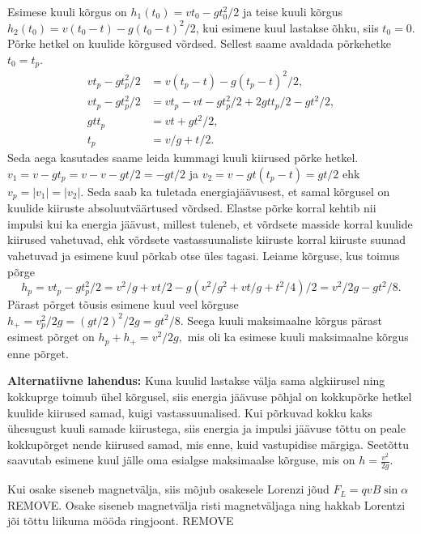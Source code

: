 \documentclass[10pt]{article}
\newcommand{\pp}[1]{REMOVE}
\begin{document}

\solu
Esimese kuuli kõrgus on \(h_1(t_0) = vt_0 - gt_0^2/2\) ja teise kuuli kõrgus \(h_2(t_0) = v(t_0-t) - g(t_0 - t)^2/2\), kui esimene kuul lastakse õhku, siis \(t_0 = 0\). Põrke hetkel on kuulide kõrgused võrdsed. Sellest saame avaldada põrkehetke \(t_0 = t_p\).
\begin{align*}
    vt_p - gt_p^2/2 &= v(t_p-t) - g(t_p -t)^2/2, \\
    vt_p - gt_p^2/2 &= vt_p - vt - gt_p^2/2 + 2gtt_p/2 - gt^2/2,\\
    gtt_p &= vt + gt^2/2, \\
    t_p &= v/g + t/2.
\end{align*}
Seda aega kasutades saame leida kummagi kuuli kiirused põrke hetkel. \(v_1 = v - gt_p = v - v - gt/2 = -gt/2\) ja \(v_2 = v -gt(t_p-t) = gt/2\) ehk \(v_p = |v_1| = |v_2|\). Seda saab ka tuletada energiajäävusest, et samal kõrgusel on kuulide kiiruste absoluutväärtused võrdsed. Elastse põrke korral kehtib nii impulsi kui ka energia jäävust, millest tuleneb, et võrdsete masside korral kuulide kiirused vahetuvad, ehk võrdsete vastassuunaliste kiiruste korral kiiruste suunad vahetuvad ja esimene kuul põrkab otse üles tagasi. Leiame kõrguse, kus toimus põrge
\[h_p = vt_p - gt_p^2/2 = v^2/g + vt/2 - g(v^2/g^2 + vt/g + t^2/4)/2 = v^2/2g - gt^2/8.\]
Pärast põrget tõusis esimene kuul veel kõrguse \(h_+ = v_p^2/2g = (gt/2)^2/2g = gt^2/8.\) Seega kuuli maksimaalne kõrgus pärast esimest põrget on \(h_p + h_+ = v^2/2g,\) mis oli ka esimese kuuli maksimaalne kõrgus enne põrget.

\textbf{Alternatiivne lahendus:} Kuna kuulid lastakse välja sama algkiirusel ning kokkuprge toimub ühel kõrgusel, siis energia jäävuse põhjal on kokkupõrke hetkel kuulide kiirused samad, kuigi vastassuunalised. Kui põrkuvad kokku kaks ühesugust kuuli samade kiirustega, siis energia ja impulsi jäävuse tõttu on peale kokkupõrget nende kiirused samad, mis enne, kuid vastupidise märgiga. Seetõttu saavutab esimene kuul jälle oma esialgse maksimaalse kõrguse, mis on $h=\frac{v^2}{2g}$.
\probend
\bigskip

\setAuthor{}

\solu
Kui osake siseneb magnetvälja, siis mõjub osakesele Lorenzi jõud $F_L = qvB\sin{\alpha}$ \pp{1}. Osake siseneb magnetvälja risti magnetväljaga ning hakkab Lorentzi jõi tõttu liikuma mööda ringjoont. \pp{2}
\end{document}
